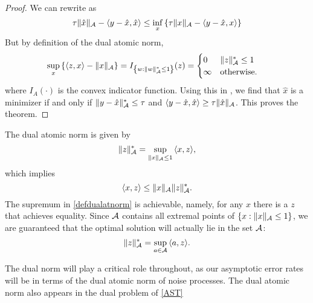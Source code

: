 \begin{proof}
We can rewrite  as
\begin{equation}
\label{eq:reformulate-subgradient}
\tau \lVert\hat{x}\rVert_{\mathcal{A}} - \langle y - \hat{x}, \hat{x}\rangle \leq \inf_x \left\{ \tau \lVert x\rVert_{\mathcal{A}} - \langle y - \hat{x}, x\rangle \right\}
\end{equation}
But by definition of the dual atomic norm, 
\begin{align}
\label{eq:conjugate-norm}
\sup_x \left\{ \langle z, x\rangle - \lVert x\rVert_{\mathcal{A}} \right\} &=  I_{\left\{ w : \lVert w\rVert_{\mathcal{A}}^* \leq 1\right\}}(z)
 = 
\begin{cases}
0 & \lVert z\rVert_{\mathcal{A}}^* \leq 1\\
\infty & \text{otherwise.}
\end{cases}
\end{align}
where $I_A(\cdot)$ is the convex indicator function. Using this in , we find that $\hat{x}$ is a minimizer if and only if $\lVert y - \hat{x}\rVert_{\mathcal{A}}^* \leq \tau$ and $\langle y - \hat{x}, \hat{x}\rangle \geq \tau \lVert\hat{x}\rVert_{\mathcal{A}}$. This proves the theorem.
\end{proof}


The dual atomic norm is given by
\begin{equation}
  \label{defdualatnorm}
  \lVert z\rVert_{\mathcal{A}}^* = \sup_{\lVert x\rVert_{\mathcal{A}} \leq 1}{\langle x, z\rangle},
\end{equation}
which implies
\begin{equation}
  \label{holder}
  \langle x, z\rangle \leq \lVert x\rVert_{\mathcal{A}} \lVert z\rVert_{\mathcal{A}}^*.
\end{equation}
The supremum in \eqref{defdualatnorm} is achievable, namely, for any $x$ there is a
$z$ that achieves equality. Since $\mathcal{A}$ contains all extremal points of
$\{x: \|x\|_{\mathcal{A}} \leq 1\}$, we are guaranteed that the optimal solution will actually lie in the set
$\mathcal{A}$:
\begin{equation}
\lVert z\rVert_{\mathcal{A}}^* = \sup_{a \in \mathcal{A}}{\langle a, z\rangle}.\label{bonsall}
\end{equation}

The dual norm will play a critical role throughout, as our asymptotic error
rates will be in terms of the dual atomic norm of noise processes. The dual
atomic norm also appears in the dual problem of \eqref{AST} 

